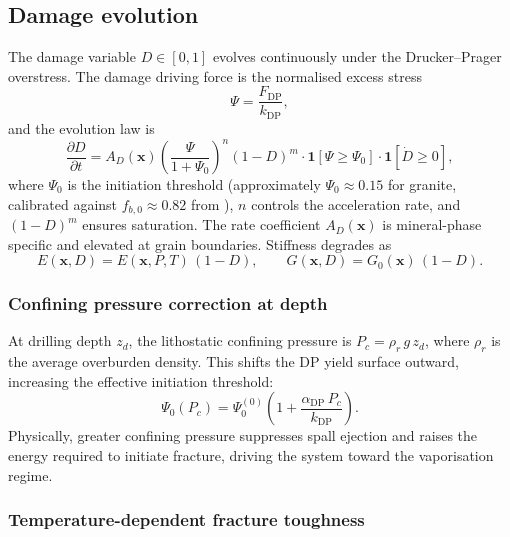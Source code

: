 \documentclass[12pt, a4paper]{article}
\newcommand{\pd}[2]{\dfrac{\partial #1}{\partial #2}}
\newcommand{\vv}[1]{\bm{#1}}
\begin{document}
\subsection{Damage evolution}
\label{sec:damage}

The damage variable $D \in [0,1]$ evolves continuously under the Drucker--Prager
overstress.  The damage driving force is the normalised excess stress
\begin{equation}
    \Psi = \frac{F_\mathrm{DP}}{k_\mathrm{DP}},
    \label{eq:psi}
\end{equation}
and the evolution law is
\begin{equation}
    \pd{D}{t} =
    A_D(\vv{x})\left(\frac{\Psi}{1 + \Psi_0}\right)^{\!n}(1-D)^m
    \cdot\mathbf{1}[\Psi \ge \Psi_0] \cdot \mathbf{1}[\dot{D} \ge 0],
    \label{eq:damage_evo}
\end{equation}
where $\Psi_0$ is the initiation threshold (approximately $\Psi_0 \approx 0.15$
for granite, calibrated against $f_{b,0} \approx 0.82$ from \citealt{hu2018lrst}),
$n$ controls the acceleration rate, and $(1-D)^m$ ensures saturation.  The rate
coefficient $A_D(\vv{x})$ is mineral-phase specific and elevated at grain
boundaries.  Stiffness degrades as
\begin{equation}
    E(\vv{x},D) = E(\vv{x},P,T)\,(1-D), \qquad G(\vv{x},D) = G_0(\vv{x})\,(1-D).
    \label{eq:stiffness_degrade}
\end{equation}

\subsubsection{Confining pressure correction at depth}

At drilling depth $z_d$, the lithostatic confining pressure is
$P_c = \rho_r\,g\,z_d$, where $\rho_r$ is the average overburden density.
This shifts the DP yield surface outward, increasing the effective initiation
threshold:
\begin{equation}
    \Psi_0(P_c) = \Psi_0^{(0)}\left(1 + \frac{\alpha_\mathrm{DP}\,P_c}{k_\mathrm{DP}}\right).
    \label{eq:depth_correction}
\end{equation}
Physically, greater confining pressure suppresses spall ejection and raises the
energy required to initiate fracture, driving the system toward the vaporisation
regime.

\subsubsection{Temperature-dependent fracture toughness}
\end{document}
